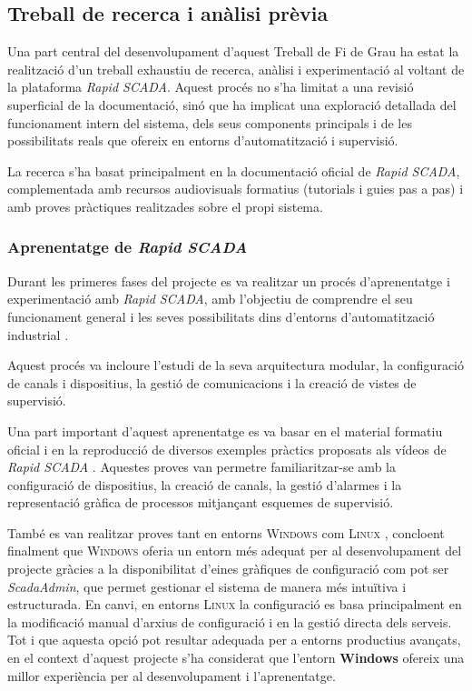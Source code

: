 \documentclass[a4paper,11pt,DIV=13,headings=normal,abstract=true,twoside=semi]{article}
\newcommand{\acro}[1]{\textsc{#1}}
\begin{document}
\subsection{Treball de recerca i anàlisi prèvia}

Una part central del desenvolupament d'aquest Treball de Fi de Grau ha estat la realització d'un treball exhaustiu de recerca, anàlisi i experimentació al voltant de la plataforma \emph{Rapid SCADA}. Aquest procés no s'ha limitat a una revisió superficial de la documentació, sinó que ha implicat una exploració detallada del funcionament intern del sistema, dels seus components principals i de les possibilitats reals que ofereix en entorns d'automatització i supervisió.

La recerca s'ha basat principalment en la documentació oficial de \emph{Rapid SCADA}, complementada amb recursos audiovisuals formatius (tutorials i guies pas a pas) i amb proves pràctiques realitzades sobre el propi sistema. %

\subsubsection{Aprenentatge de \emph{Rapid SCADA}}
\label{sec:rapidscada_research}

Durant les primeres fases del projecte es va realitzar un procés d'aprenentatge i experimentació amb \emph{Rapid SCADA}, amb l'objectiu de comprendre el seu funcionament general i les seves possibilitats dins d'entorns d'automatització industrial \cite{RapidScada,rapidscada_intro}.

Aquest procés va incloure l'estudi de la seva arquitectura modular, la configuració de canals i dispositius, la gestió de comunicacions i la creació de vistes de supervisió.

Una part important d'aquest aprenentatge es va basar en el material formatiu oficial i en la reproducció de diversos exemples pràctics proposats als vídeos de \emph{Rapid SCADA} \cite{RapidScadaVideos}. Aquestes proves van permetre familiaritzar-se amb la configuració de dispositius, la creació de canals, la gestió d'alarmes i la representació gràfica de processos mitjançant esquemes de supervisió.


També es van realitzar proves tant en entorns \acro{Windows} com \acro{Linux} \cite{rapidscada_windows_install,rapidscada_linux_install}, concloent finalment que \acro{Windows} oferia un entorn més adequat per al desenvolupament del projecte gràcies a la disponibilitat d'eines gràfiques de configuració com pot ser \emph{ScadaAdmin}, que permet gestionar el sistema de manera més intuïtiva i estructurada. En canvi, en entorns \acro{Linux} la configuració es basa principalment en la modificació manual d'arxius de configuració i en la gestió directa dels serveis. Tot i que aquesta opció pot resultar adequada per a entorns productius avançats, en el context d'aquest projecte s'ha considerat que l'entorn \textbf{Windows} ofereix una millor experiència per al desenvolupament i l'aprenentatge.
\end{document}
